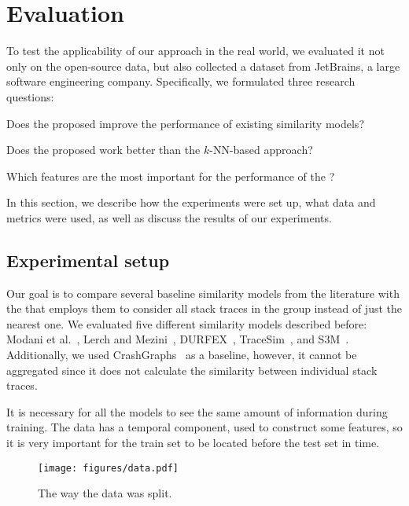 \section{Evaluation}\label{sec:evaluation}

To test the applicability of our approach in the real world, we evaluated it not only on the open-source data, but also collected a dataset from JetBrains, a large software engineering company.
Specifically, we formulated three research questions:

\begin{questions}[leftmargin=1.3cm]
    \item Does the proposed \ag improve the performance of existing similarity models?
    \item Does the proposed \ag work better than the $k$-NN-based approach?
    \item Which features are the most important for the performance of the \ag?
\end{questions}

In this section, we describe how the experiments were set up, what data and metrics were used, as well as discuss the results of our experiments.

\subsection{Experimental setup}

Our goal is to compare several baseline similarity models from the literature with the \ag that employs them to consider all stack traces in the group instead of just the nearest one.
We evaluated five different similarity models described before: Modani et al.~\cite{modani}, Lerch and Mezini~\cite{lerch}, DURFEX~\cite{durfex}, TraceSim~\cite{tracesim}, and S3M~\cite{s3m}.
Additionally, we used CrashGraphs~\cite{crash_graphs} as a baseline, however, it cannot be aggregated since it does not calculate the similarity between individual stack traces.

It is necessary for all the models to see the same amount of information during training.
The data has a temporal component, used to construct some features, so it is very important for the train set to be located before the test set in time.

\begin{figure}[htbp]
\centering
    \texttt{[image: figures/data.pdf]}
    \centering
    \vspace{-0.4cm}
    \caption{The way the data was split.}
    \label{fig:data}
\end{figure}

